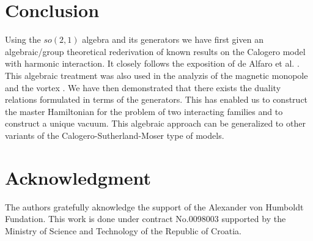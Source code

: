 \documentclass[a4paper,preprint,aps]{revtex4}
\begin{document}
\section{Conclusion}


Using the $so(2,1)$ algebra and its generators we have first given an
 algebraic/group theoretical rederivation of known results on the Calogero
 model with harmonic interaction. It closely follows the exposition of
 de Alfaro et al. \cite{AFF}. This algebraic treatment was also used in
 the analyzis of the magnetic monopole and the vortex \cite{Jac}. We have then
 demonstrated that there exists the duality relations formulated in terms of
 the generators. This has enabled us to construct the master Hamiltonian for
 the problem of two interacting families and to construct a unique vacuum.
 This algebraic approach can be generalized to other variants of the
 Calogero-Sutherland-Moser type of models.



\section*{ Acknowledgment}

The authors gratefully aknowledge the support of the Alexander von
 Humboldt Fundation.
This work is done under contract No.0098003 supported by the Ministry of 
Science and Technology of the Republic of Croatia.
\end{document}
